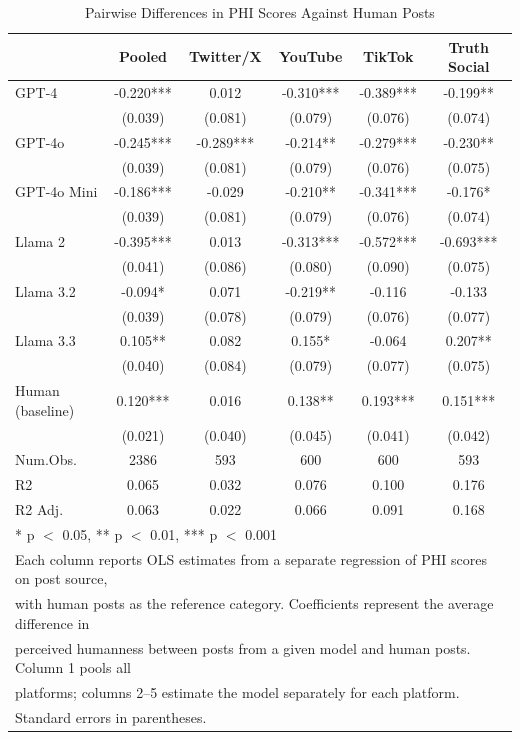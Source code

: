 \begin{table}
\centering
\caption{Pairwise Differences in PHI Scores Against Human Posts}
\centering
\begin{tabular}[t]{lccccc}
\toprule
  & Pooled & Twitter/X & YouTube & TikTok & Truth Social\\
\midrule
GPT-4 & -0.220*** & 0.012 & -0.310*** & -0.389*** & -0.199**\\
 & (0.039) & (0.081) & (0.079) & (0.076) & \vphantom{1} (0.074)\\
GPT-4o & -0.245*** & -0.289*** & -0.214** & -0.279*** & -0.230**\\
 & (0.039) & (0.081) & (0.079) & (0.076) & (0.075)\\
GPT-4o Mini & -0.186*** & -0.029 & -0.210** & -0.341*** & -0.176*\\
 & (0.039) & (0.081) & (0.079) & (0.076) & (0.074)\\
Llama 2 & -0.395*** & 0.013 & -0.313*** & -0.572*** & -0.693***\\
 & (0.041) & (0.086) & (0.080) & (0.090) & (0.075)\\
Llama 3.2 & -0.094* & 0.071 & -0.219** & -0.116 & -0.133\\
 & (0.039) & (0.078) & (0.079) & (0.076) & (0.077)\\
Llama 3.3 & 0.105** & 0.082 & 0.155* & -0.064 & 0.207**\\
 & (0.040) & (0.084) & (0.079) & (0.077) & (0.075)\\
Human (baseline) & 0.120*** & 0.016 & 0.138** & 0.193*** & 0.151***\\
 & (0.021) & (0.040) & (0.045) & (0.041) & (0.042)\\
\midrule
Num.Obs. & 2386 & 593 & 600 & 600 & 593\\
R2 & 0.065 & 0.032 & 0.076 & 0.100 & 0.176\\
R2 Adj. & 0.063 & 0.022 & 0.066 & 0.091 & 0.168\\
\bottomrule
\multicolumn{6}{l}{\rule{0pt}{1em}* p $<$ 0.05, ** p $<$ 0.01, *** p $<$ 0.001}\\
\multicolumn{6}{l}{\rule{0pt}{1em}Each column reports OLS estimates from a separate regression of PHI scores on post source,}\\
\multicolumn{6}{l}{\rule{0pt}{1em}with human posts as the reference category. Coefficients represent the average difference in}\\
\multicolumn{6}{l}{\rule{0pt}{1em}perceived humanness between posts from a given model and human posts. Column 1 pools all}\\
\multicolumn{6}{l}{\rule{0pt}{1em}platforms; columns 2--5 estimate the model separately for each platform.}\\
\multicolumn{6}{l}{\rule{0pt}{1em}Standard errors in parentheses.}\\
\end{tabular}
\end{table}
